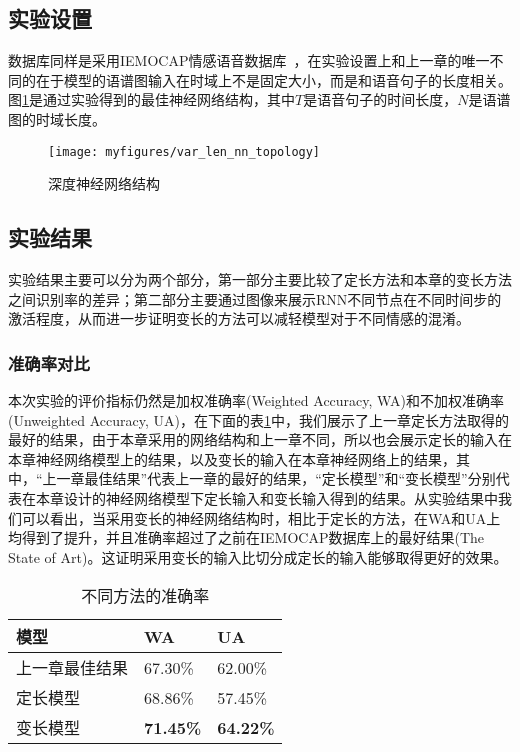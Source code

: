 \subsection{实验设置}
\label{sec:var_len_experiement_setup}

数据库同样是采用IEMOCAP情感语音数据库~\cite{Busso2008IEMOCAP}，在实验设置上和上一章的唯一不同的在于模型的语谱图输入在时域上不是固定大小，而是和语音句子的长度相关。图\ref{fig:var_len_nn_topology}是通过实验得到的最佳神经网络结构，其中$T$是语音句子的时间长度，$N$是语谱图的时域长度。

\begin{figure}[htb] %
    \centering
    \texttt{[image: myfigures/var\_len\_nn\_topology]}
    \caption{深度神经网络结构}
    \label{fig:var_len_nn_topology}
\end{figure}

\subsection{实验结果}
\label{sec:var_len_experiement_result}

实验结果主要可以分为两个部分，第一部分主要比较了定长方法和本章的变长方法之间识别率的差异；第二部分主要通过图像来展示RNN不同节点在不同时间步的激活程度，从而进一步证明变长的方法可以减轻模型对于不同情感的混淆。

\subsubsection{准确率对比}
\label{sec:var_len_experiement_acc}
本次实验的评价指标仍然是加权准确率(Weighted Accuracy, WA)和不加权准确率(Unweighted Accuracy, UA)，在下面的表\ref{tab:acc_var_len}中，我们展示了上一章定长方法取得的最好的结果，由于本章采用的网络结构和上一章不同，所以也会展示定长的输入在本章神经网络模型上的结果，以及变长的输入在本章神经网络上的结果，其中，“上一章最佳结果”代表上一章的最好的结果，“定长模型”和“变长模型”分别代表在本章设计的神经网络模型下定长输入和变长输入得到的结果。从实验结果中我们可以看出，当采用变长的神经网络结构时，相比于定长的方法，在WA和UA上均得到了提升，并且准确率超过了之前在IEMOCAP数据库上的最好结果(The State of Art)。这证明采用变长的输入比切分成定长的输入能够取得更好的效果。
\begin{table}[htb]
\centering
\begin{minipage}[t]{0.8\linewidth} %
\caption{不同方法的准确率}
\label{tab:acc_var_len}
    \begin{tabularx}{\linewidth}{X<{\centering} X<{\centering} X<{\centering}}
        \toprule[1.5pt]
        模型 & WA & UA \\
        \midrule[1pt]
        上一章最佳结果 & 67.30\% & 62.00\% \\
        定长模型 & 68.86\% & 57.45\% \\
        变长模型 & \textbf{71.45\%} & \textbf{64.22\%} \\
        \bottomrule[1.5pt]
    \end{tabularx}
\end{minipage}
\end{table}

